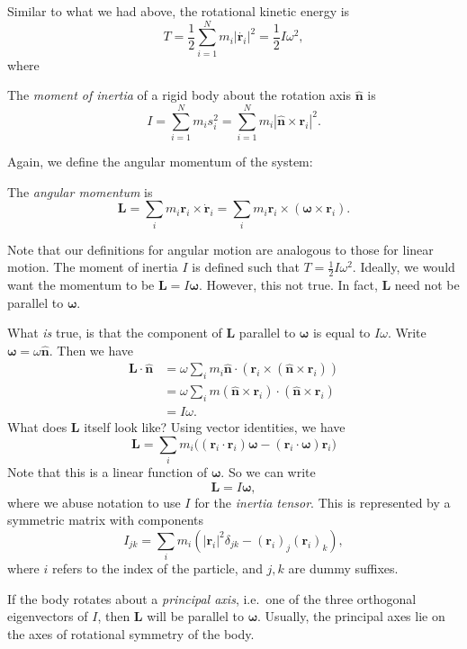 \documentclass[a4paper]{article}
\begin{document}
Similar to what we had above, the rotational kinetic energy is
\[
  T = \frac{1}{2}\sum_{i = 1}^N m_i|\dot{\mathbf{r}_i}|^2 = \frac{1}{2}I\omega^2,
\]
where
\begin{defi}
  The \emph{moment of inertia} of a rigid body about the rotation axis $\hat{\mathbf{n}}$ is
  \[
    I = \sum_{i = 1}^N m_is_i^2 = \sum_{i = 1}^N m_i |\hat{\mathbf{n}}\times \mathbf{r}_i|^2.
  \]
\end{defi}
Again, we define the angular momentum of the system:
\begin{defi}
  The \emph{angular momentum} is
  \[
    \mathbf{L} = \sum_i m_i \mathbf{r}_i \times \dot{\mathbf{r}}_i = \sum_i m_i \mathbf{r}_i \times (\boldsymbol\omega \times \mathbf{r}_i).
  \]
\end{defi}
Note that our definitions for angular motion are analogous to those for linear motion. The moment of inertia $I$ is defined such that $T = \frac{1}{2}I\omega^2$. Ideally, we would want the momentum to be $\mathbf{L} = I\boldsymbol \omega$. However, this not true. In fact, $\mathbf{L}$ need not be parallel to $\boldsymbol\omega$.

What \emph{is} true, is that the component of $\mathbf{L}$ parallel to $\boldsymbol\omega$ is equal to $I\omega$. Write $\boldsymbol\omega = \omega\hat{\mathbf{n}}$. Then we have
\begin{align*}
  \mathbf{L} \cdot \hat{\mathbf{n}} &= \omega \sum_i m_i \hat{\mathbf{n}}\cdot (\mathbf{r}_i \times (\hat{\mathbf{n}} \times \mathbf{r}_i))\\
  &= \omega \sum_i m(\hat{\mathbf{n}}\times \mathbf{r}_i)\cdot (\hat{\mathbf{n}} \times \mathbf{r}_i)\\
  &= I\omega.
\end{align*}
What does $\mathbf{L}$ itself look like? Using vector identities, we have
\[
  \mathbf{L} = \sum_i m_i\big((\mathbf{r}_i\cdot \mathbf{r}_i)\boldsymbol \omega - (\mathbf{r}_i \cdot \boldsymbol\omega)\mathbf{r}_i\big)
\]
Note that this is a linear function of $\boldsymbol\omega$. So we can write
\[
  \mathbf{L} = I\boldsymbol \omega,
\]
where we abuse notation to use $I$ for the \emph{inertia tensor}. This is represented by a symmetric matrix with components
\[
  I_{jk} = \sum_i m_i(|\mathbf{r}_i|^2 \delta_{jk} - (\mathbf{r}_i)_j(\mathbf{r}_i)_k),
\]
where $i$ refers to the index of the particle, and $j, k$ are dummy suffixes.

If the body rotates about a \emph{principal axis}, i.e.\ one of the three orthogonal eigenvectors of $I$, then $\mathbf{L}$ will be parallel to $\boldsymbol\omega$. Usually, the principal axes lie on the axes of rotational symmetry of the body.
\end{document}
